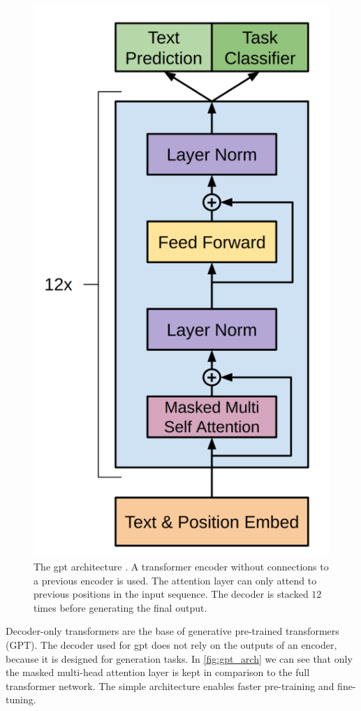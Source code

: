\documentclass[../main.tex]{subfiles}
\begin{document}
\begin{figure}[t]
    \centering
    \includegraphics[scale=0.3]{include/images/gpt_architecture.png}
    \caption{
        The \gls{gpt} architecture \cite{Radford2018}.
        A transformer encoder
        without connections to a previous encoder is used.
        The attention layer
        can only attend to previous positions in the input sequence.
        The decoder is stacked $12$ times before generating the final output.
    }
    \label{fig:gpt_arch}
\end{figure}


Decoder-only transformers are the base of generative pre-trained transformers (GPT).
The decoder used for \gls{gpt} does not rely on the outputs of an encoder,
because it is designed for generation tasks.
In \autoref{fig:gpt_arch} we can see
that only the masked multi-head attention layer is kept in comparison to
the full transformer network.
The simple architecture enables faster pre-training and fine-tuning.
\end{document}
